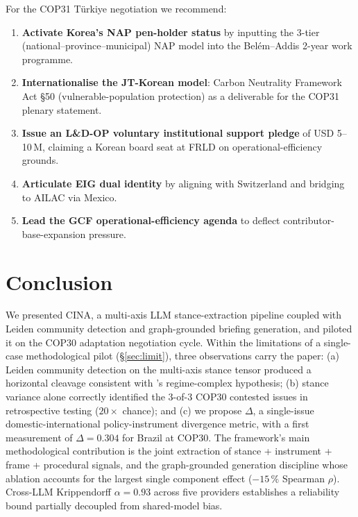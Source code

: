 \documentclass[11pt,a4paper]{article}
\begin{document}
For the COP31 Türkiye negotiation we recommend:
\begin{enumerate}[leftmargin=*]
  \item \textbf{Activate Korea's NAP pen-holder status} by inputting the 3-tier (national--province--municipal) NAP model into the Belém--Addis 2-year work programme.
  \item \textbf{Internationalise the JT-Korean model}: Carbon Neutrality Framework Act §50 (vulnerable-population protection) as a deliverable for the COP31 plenary statement.
  \item \textbf{Issue an L\&D-OP voluntary institutional support pledge} of USD 5--10\,M, claiming a Korean board seat at FRLD on operational-efficiency grounds.
  \item \textbf{Articulate EIG dual identity} by aligning with Switzerland and bridging to AILAC via Mexico.
  \item \textbf{Lead the GCF operational-efficiency agenda} to deflect contributor-base-expansion pressure.
\end{enumerate}

\section{Conclusion}
\label{sec:conclusion}

We presented CINA, a multi-axis LLM stance-extraction pipeline coupled with Leiden community detection and graph-grounded briefing generation, and piloted it on the COP30 adaptation negotiation cycle. Within the limitations of a single-case methodological pilot (§\ref{sec:limit}), three observations carry the paper: (a) Leiden community detection on the multi-axis stance tensor produced a horizontal cleavage consistent with \citet{keohane2011}'s regime-complex hypothesis; (b) stance variance alone correctly identified the 3-of-3 COP30 contested issues in retrospective testing ($20\times$ chance); and (c) we propose $\Delta$, a single-issue domestic-international policy-instrument divergence metric, with a first measurement of $\Delta = 0.304$ for Brazil at COP30. The framework's main methodological contribution is the joint extraction of stance + instrument + frame + procedural signals, and the graph-grounded generation discipline whose ablation accounts for the largest single component effect ($-15\,\%$ Spearman $\rho$). Cross-LLM Krippendorff $\alpha = 0.93$ across five providers establishes a reliability bound partially decoupled from shared-model bias.
\end{document}
